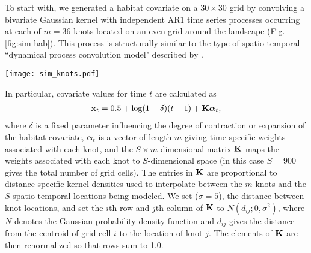 \documentclass[12pt,fleqn]{article}
\begin{document}
\begin{flushleft}
To start with, we generated a habitat covariate on a $30 \times 30$ grid by convolving a bivariate Gaussian kernel with independent AR1 time series processes occurring at each of $m=36$ knots located on an even grid around the landscape (Fig. \ref{fig:sim-hab}).  This process is structurally similar to the type of spatio-temporal ``dynamical process convolution model" described by \citet{CalderEtAl2002}.

\begin{figure*}
\begin{center}
\texttt{[image: sim\_knots.pdf]}
\caption{Spatial grid and knot positions (blue points) for simulating spatio-temporal variation in a hypothetical habitat covariate.} \label{fig:sim-hab}
\end{center}
\end{figure*}

\hspace{.5in} In particular, covariate values for time $t$ are calculated as
\begin{eqnarray*}
  {\bf x}_t = 0.5 + \log(1+\delta) (t-1) + {\bf K}\boldsymbol{\alpha}_t,
\end{eqnarray*}
where $\delta$ is a fixed parameter influencing the degree of contraction or expansion of the habitat covariate, $\boldsymbol{\alpha}_t$ is a vector of length $m$ giving time-specific weights associated with each knot, and the $S \times m$ dimensional matrix ${\bf K}$ maps the weights associated with each knot to $S$-dimensional space (in this case $S=900$ gives the total number of grid cells).  The entries in ${\bf K}$ are proportional to distance-specific kernel densities used to interpolate between the $m$ knots and the $S$ spatio-temporal locations being modeled.  We set ($\sigma=5$), the distance between knot locations, and set the $i$th row and $j$th column of ${\bf K}$ to $N(d_{ij}; 0,\sigma^2)$, where $N$ denotes the Gaussian probability density function and $d_{ij}$ gives the distance from the centroid of grid cell $i$ to the location of knot $j$.  The elements of ${\bf K}$ are then renormalized so that rows sum to 1.0.


\end{flushleft}
\end{document}
